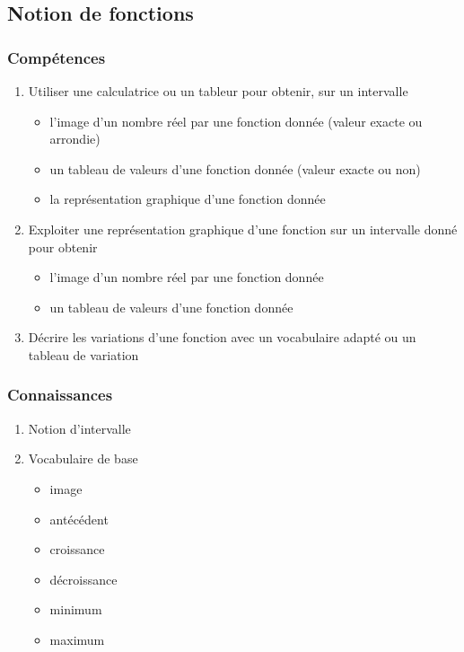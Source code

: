\documentclass[12pt,a4paper]{article}
\begin{document}
\subsection{Notion de fonctions}
\begin{multicols}{2}
	\subsubsection*{Compétences}
	\begin{enumerate}
		\item Utiliser une calculatrice ou un tableur pour obtenir, sur un intervalle
		\begin{itemize}
			\item l'image d'un nombre réel par une fonction donnée (valeur exacte ou arrondie)
			\item un tableau de valeurs d'une fonction donnée (valeur exacte ou non)
			\item la représentation graphique d'une fonction donnée
		\end{itemize}
		\item Exploiter une représentation graphique d'une fonction sur un intervalle donné pour obtenir
		\begin{itemize}
			\item l'image d'un nombre réel par une fonction donnée
			\item un tableau de valeurs d'une fonction donnée
		\end{itemize}
		\item Décrire les variations d'une fonction avec un vocabulaire adapté ou un tableau de variation
	\end{enumerate}
	
	\subsubsection*{Connaissances}
	\begin{enumerate}
		\item Notion d'intervalle
		\item Vocabulaire de base
		\begin{itemize}
			\item image
			\item antécédent 
			\item croissance
			\item décroissance
			\item minimum
			\item maximum
		\end{itemize}
	
	\end{enumerate}
\end{multicols}
\end{document}
